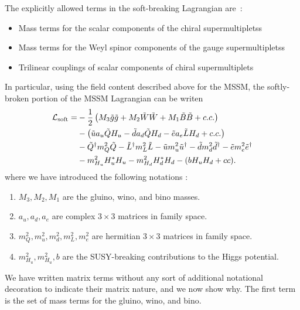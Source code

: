 The explicitly allowed terms in the soft-breaking Lagrangian are~\cite{archilSUSYLectures}:
\begin{itemize}
\item Mass terms for the scalar components of the chiral supermultipletss
\item Mass terms for the Weyl spinor components of the gauge supermultipletss
\item Trilinear couplings of scalar components of chiral supermultiplets
\end{itemize}
In particular, using the field content described above for the MSSM, the softly-broken portion of the MSSM Lagrangian can be writen
\begin{align}
\mathcal{L}_{\text{soft}} = &-\frac{1}{2}\begin{pmatrix} M_3 \tilde{g} \tilde{g} + M_2 \tilde{W} \tilde{W} + M_1 \tilde{B} \tilde{B} + c.c. \end{pmatrix} \\
                    &-\begin{pmatrix} \tilde{u} a_u \tilde{Q} H_u - \tilde{d} a_d \tilde{Q} H_d - \tilde{e} a_e \tilde{L} H_d + c.c. \end{pmatrix} \\
                    &- \tilde{Q}^\dagger m_Q^2 \tilde{Q} - \tilde{L}^\dagger m_L^2 \tilde{L} - \tilde{u} m_u^2 \tilde{u}^\dagger - \tilde{d} m_d^2 \tilde{d}^\dagger - \tilde{e} m_e^2 \tilde{e}^\dagger \\
                    &- m^2_{H_u} H_u^* H_u - m^2_{H_d} H_d^* H_d - (b H_u H_d + cc).
\end{align}
where we have introduced the following notations :
\begin{enumerate}
\item $M_3,M_2,M_1$ are the gluino, wino, and bino masses. \label{list:gaugino_masses}
\item $a_u,a_d,a_e$  are complex $3 \times 3$ matrices in family space. \label{list:yukawa_couplings}
\item $m_Q^2 , m_u^2, m_d^2, m_L^2,m_e^2 $ are hermitian  $3 \times 3$ matrices in family space. \label{list:flavor_changing}
\item $m_{H_u}^2, m_{H_u}^2, b$ are the SUSY-breaking contributions to the Higgs potential. \label{list:higgs}
\end{enumerate}
We have written matrix terms without any sort of additional notational decoration to indicate their matrix nature, and we now show why.
The first term  is the set of mass terms for the gluino, wino, and bino.
